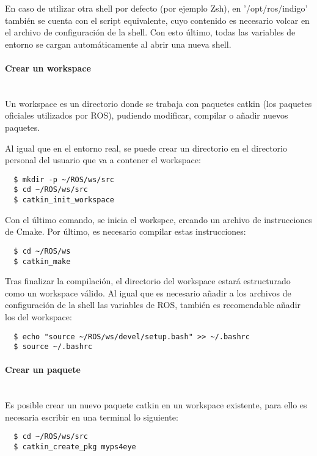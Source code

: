 En caso de utilizar otra shell por defecto (por ejemplo Zsh), en 
'/opt/ros/indigo' también se cuenta con el script equivalente, cuyo contenido es
necesario volcar en el archivo de configuración de la shell. Con esto último,
todas las variables de entorno se cargan automáticamente al abrir una nueva
shell.

\paragraph{Crear un workspace} \hspace{0pt} \\
Un workspace es un directorio donde se trabaja con paquetes catkin (los paquetes
oficiales utilizados por ROS), pudiendo modificar, compilar o añadir nuevos
paquetes.

Al igual que en el entorno real, se puede crear un directorio en el directorio
personal del usuario que va a contener el workspace:
\\
\begin{lstlisting}
  $ mkdir -p ~/ROS/ws/src
  $ cd ~/ROS/ws/src
  $ catkin_init_workspace
\end{lstlisting}

Con el último comando, se inicia el workspce, creando un archivo de
instrucciones de Cmake. Por último, es necesario compilar estas instrucciones:
\\
\begin{lstlisting}
  $ cd ~/ROS/ws
  $ catkin_make
\end{lstlisting}

Tras finalizar la compilación, el directorio del workspace estará estructurado
como un workspace válido. Al igual que es necesario añadir a los archivos de
configuración de la shell las variables de ROS, también es recomendable añadir
los del workspace:
\\
\begin{lstlisting}
  $ echo "source ~/ROS/ws/devel/setup.bash" >> ~/.bashrc
  $ source ~/.bashrc
\end{lstlisting}

\paragraph{Crear un paquete} \hspace{0pt} \\
Es posible crear un nuevo paquete catkin en un workspace existente, para ello es
necesaria escribir en una terminal lo siguiente:
\\
\begin{lstlisting}
  $ cd ~/ROS/ws/src
  $ catkin_create_pkg myps4eye
\end{lstlisting}

